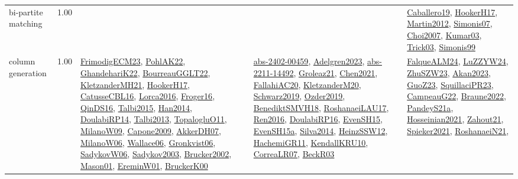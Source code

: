 {\begin{longtable}{p{3cm}r>{\raggedright\arraybackslash}p{6cm}>{\raggedright\arraybackslash}p{6cm}>{\raggedright\arraybackslash}p{8cm}}
\index{bi-partite matching}\index{Algorithms!bi-partite matching}bi-partite matching &  1.00 &  &  & \hyperref[detail:Caballero19]{Caballero19}, \hyperref[detail:HookerH17]{HookerH17}, \hyperref[detail:Martin2012]{Martin2012}, \hyperref[detail:Simonis07]{Simonis07}, \hyperref[detail:Choi2007]{Choi2007}, \hyperref[detail:Kumar03]{Kumar03}, \hyperref[detail:Trick03]{Trick03}, \hyperref[detail:Simonis99]{Simonis99}\\
\index{column generation}\index{Algorithms!column generation}column generation &  1.00 & \hyperref[detail:FrimodigECM23]{FrimodigECM23}, \hyperref[detail:PohlAK22]{PohlAK22}, \hyperref[detail:GhandehariK22]{GhandehariK22}, \hyperref[detail:BourreauGGLT22]{BourreauGGLT22}, \hyperref[detail:KletzanderMH21]{KletzanderMH21}, \hyperref[detail:HookerH17]{HookerH17}, \hyperref[detail:CatusseCBL16]{CatusseCBL16}, \hyperref[detail:Lorca2016]{Lorca2016}, \hyperref[detail:Froger16]{Froger16}, \hyperref[detail:QinDS16]{QinDS16}, \hyperref[detail:Talbi2015]{Talbi2015}, \hyperref[detail:Han2014]{Han2014}, \hyperref[detail:DoulabiRP14]{DoulabiRP14}, \hyperref[detail:Talbi2013]{Talbi2013}, \hyperref[detail:TopalogluO11]{TopalogluO11}, \hyperref[detail:MilanoW09]{MilanoW09}, \hyperref[detail:Capone2009]{Capone2009}, \hyperref[detail:AkkerDH07]{AkkerDH07}, \hyperref[detail:MilanoW06]{MilanoW06}, \hyperref[detail:Wallace06]{Wallace06}, \hyperref[detail:Gronkvist06]{Gronkvist06}, \hyperref[detail:SadykovW06]{SadykovW06}, \hyperref[detail:Sadykov2003]{Sadykov2003}, \hyperref[detail:Brucker2002]{Brucker2002}, \hyperref[detail:Mason01]{Mason01}, \hyperref[detail:EreminW01]{EreminW01}, \hyperref[detail:BruckerK00]{BruckerK00} & \hyperref[detail:abs-2402-00459]{abs-2402-00459}, \hyperref[detail:Adelgren2023]{Adelgren2023}, \hyperref[detail:abs-2211-14492]{abs-2211-14492}, \hyperref[detail:Groleaz21]{Groleaz21}, \hyperref[detail:Chen2021]{Chen2021}, \hyperref[detail:FallahiAC20]{FallahiAC20}, \hyperref[detail:KletzanderM20]{KletzanderM20}, \hyperref[detail:Schwarz2019]{Schwarz2019}, \hyperref[detail:Ozder2019]{Ozder2019}, \hyperref[detail:BenediktSMVH18]{BenediktSMVH18}, \hyperref[detail:RoshanaeiLAU17]{RoshanaeiLAU17}, \hyperref[detail:Ren2016]{Ren2016}, \hyperref[detail:DoulabiRP16]{DoulabiRP16}, \hyperref[detail:EvenSH15]{EvenSH15}, \hyperref[detail:EvenSH15a]{EvenSH15a}, \hyperref[detail:Silva2014]{Silva2014}, \hyperref[detail:HeinzSSW12]{HeinzSSW12}, \hyperref[detail:HachemiGR11]{HachemiGR11}, \hyperref[detail:KendallKRU10]{KendallKRU10}, \hyperref[detail:CorreaLR07]{CorreaLR07}, \hyperref[detail:BeckR03]{BeckR03} & \hyperref[detail:FalqueALM24]{FalqueALM24}, \hyperref[detail:LuZZYW24]{LuZZYW24}, \hyperref[detail:ZhuSZW23]{ZhuSZW23}, \hyperref[detail:Akan2023]{Akan2023}, \hyperref[detail:GuoZ23]{GuoZ23}, \hyperref[detail:SquillaciPR23]{SquillaciPR23}, \hyperref[detail:CampeauG22]{CampeauG22}, \hyperref[detail:Braune2022]{Braune2022}, \hyperref[detail:PandeyS21a]{PandeyS21a}, \hyperref[detail:Hosseinian2021]{Hosseinian2021}, \hyperref[detail:Zahout21]{Zahout21}, \hyperref[detail:Spieker2021]{Spieker2021}, \hyperref[detail:RoshanaeiN21]{RoshanaeiN21}, 
\end{longtable}}
